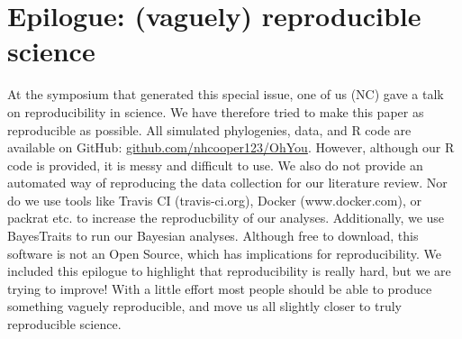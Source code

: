 \documentclass[a4paper,12pt]{article}
\begin{document}

\section{Epilogue: (vaguely) reproducible science}
  At the symposium that generated this special issue, one of us (NC) gave a talk on reproducibility in science. 
  We have therefore tried to make this paper as reproducible as possible. 
  All simulated phylogenies, data, and R code are available on GitHub: \href{https://github.com/nhcooper123/OhYou}{github.com/nhcooper123/OhYou}.
  However, although our R code is provided, it is messy and difficult to use. 
  We also do not provide an automated way of reproducing the data collection for our literature review.
  Nor do we use tools like Travis CI (travis-ci.org), Docker (www.docker.com), or packrat \citep{Ushey:2015aa} etc. to increase the reproducbility of our analyses.
  Additionally, we use BayesTraits to run our Bayesian analyses. 
  Although free to download, this software is not an Open Source, which has implications for reproducibility.
  We included this epilogue to highlight that reproducibility is really hard, but we are trying to improve! 
  With a little effort most people should be able to produce something vaguely reproducible, and move us all slightly closer to truly reproducible science. 
\end{document}
